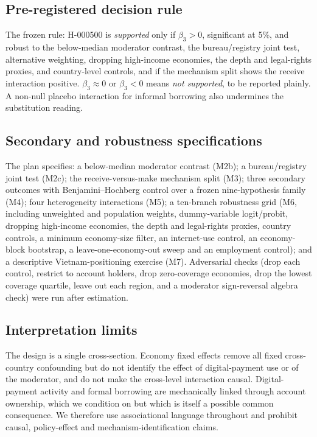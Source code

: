 \subsection{Pre-registered decision rule}

The frozen rule: H-000500 is \emph{supported} only if $\beta_3>0$, significant at 5\%, and
robust to the below-median moderator contrast, the bureau/registry joint test, alternative
weighting, dropping high-income economies, the depth and legal-rights proxies, and
country-level controls, and if the mechanism split shows the receive interaction positive.
$\beta_3\approx0$ or $\beta_3<0$ means \emph{not supported}, to be reported plainly. A
non-null placebo interaction for informal borrowing also undermines the substitution
reading.

\subsection{Secondary and robustness specifications}

The plan specifies: a below-median moderator contrast (M2b); a bureau/registry joint test
(M2c); the receive-versus-make mechanism split (M3); three secondary outcomes with
Benjamini--Hochberg control over a frozen nine-hypothesis family (M4); four heterogeneity
interactions (M5); a ten-branch robustness grid (M6, including unweighted and population
weights, dummy-variable logit/probit, dropping high-income economies, the depth and
legal-rights proxies, country controls, a minimum economy-size filter, an internet-use
control, an economy-block bootstrap, a leave-one-economy-out sweep and an employment
control); and a descriptive Vietnam-positioning exercise (M7). Adversarial checks (drop each
control, restrict to account holders, drop zero-coverage economies, drop the lowest coverage
quartile, leave out each region, and a moderator sign-reversal algebra check) were run after
estimation.

\subsection{Interpretation limits}

The design is a single cross-section. Economy fixed effects remove all fixed cross-country
confounding but do not identify the effect of digital-payment use or of the moderator, and
do not make the cross-level interaction causal. Digital-payment activity and formal
borrowing are mechanically linked through account ownership, which we condition on but which
is itself a possible common consequence. We therefore use associational language throughout
and prohibit causal, policy-effect and mechanism-identification claims.


